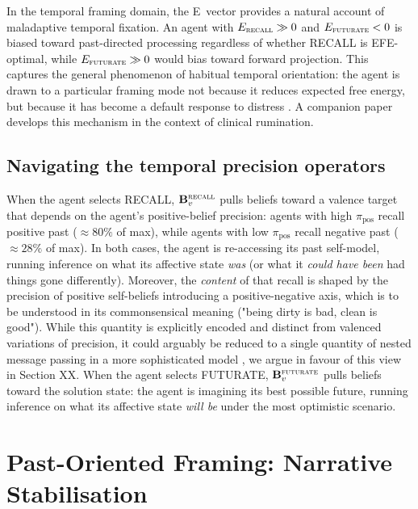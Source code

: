 \documentclass[11pt,a4paper]{article}
\begin{document}
In the temporal framing domain, the E~vector provides a natural account of maladaptive temporal fixation. An agent with $E_{\textsc{recall}} \gg 0$ and $E_{\textsc{futurate}} < 0$ is biased toward past-directed processing regardless of whether RECALL is EFE-optimal, while $E_{\textsc{futurate}} \gg 0$ would bias toward forward projection. This captures the general phenomenon of habitual temporal orientation: the agent is drawn to a particular framing mode not because it reduces expected free energy, but because it has become a default response to distress \citep{watkins2008constructive, ehring2008repetitive}. A companion paper develops this mechanism in the context of clinical rumination.


\subsection{Navigating the temporal precision operators}



When the agent selects RECALL, $\mathbf{B}_v^{\textsc{recall}}$ pulls beliefs toward a valence target that depends on the agent's positive-belief precision: agents with high $\pi_{\text{pos}}$ recall positive past ($\approx 80\%$ of max), while agents with low $\pi_{\text{pos}}$ recall negative past ($\approx 28\%$ of max). In both cases, the agent is re-accessing its past self-model, running inference on what its affective state \emph{was} (or what it \emph{could have been} had things gone differently).
Moreover, the \emph{content} of that recall is shaped by the precision of positive self-beliefs introducing a positive-negative axis, which is to be understood in its commonsensical meaning ("being dirty is bad, clean is good"). While this quantity is explicitly encoded and distinct from valenced variations of precision, it could arguably be reduced to a single quantity of nested message passing in a more sophisticated model ,  we argue in favour of this view in Section XX.
When the agent selects FUTURATE, $\mathbf{B}_v^{\textsc{futurate}}$ pulls beliefs toward the solution state: the agent is imagining its best possible future, running inference on what its affective state \emph{will be} under the most optimistic scenario.



\section{Past-Oriented Framing: Narrative Stabilisation}\label{sec:past}
\end{document}
